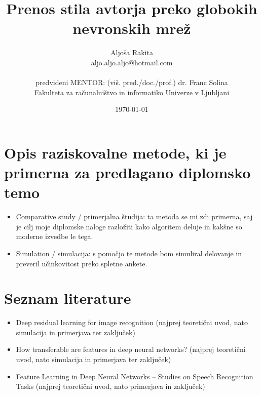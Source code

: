 \documentclass[11pt,a4paper]{article}
\title{Prenos stila avtorja preko globokih nevronskih mrež}
\author{Aljoša Rakita\\
aljo.aljo.aljo@hotmail.com\\
\ \\
predvideni MENTOR: (viš. pred./doc./prof.) dr. Franc Solina \\
Fakulteta za računalništvo in informatiko Univerze v Ljubljani
\date{\today}         
}
\begin{document}
\maketitle



\section{Opis raziskovalne metode, ki je primerna za predlagano diplomsko temo}

\begin{itemize}
\item Comparative study / primerjalna študija: ta metoda se mi zdi primerna, saj je cilj moje diplomske naloge razložiti kako algoritem deluje in kakšne so moderne izvedbe le tega.

\item Simulation / simulacija: s pomočjo te metode bom simuliral delovanje in preveril učinkovitost preko spletne ankete.
\end{itemize}



\section{Seznam literature}

\begin{itemize}
\item Deep residual learning for image recognition \cite{deepImgRec}  (najprej teoretični uvod, nato simulacija in primerjava ter zaključek)
\item How transferable are features in deep neural networks? \cite{deepFeaturesTransfer} (najprej teoretični uvod, nato simulacija in primerjava ter zaključek)

\item Feature Learning in Deep Neural Networks – Studies on Speech Recognition Tasks \cite{deepFeatureSpeech} (najprej teoretični uvod, nato primerjava in zaključek)
\end{itemize}




\end{document}
